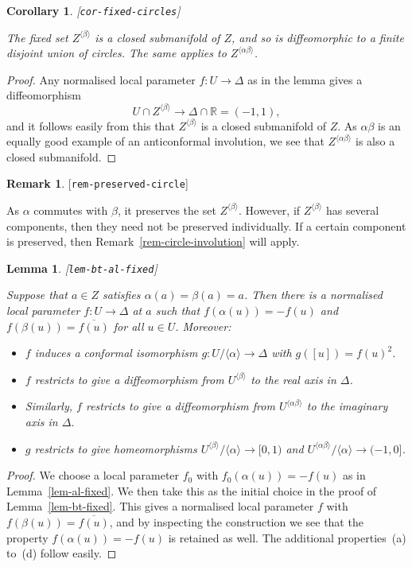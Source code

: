 \documentclass[reqno]{amsart}
\newcommand{\lbl}[1]{\label{#1}\textup{[\texttt{#1}]}\par}
\newcommand{\lbl}{\label}
\newcommand{\Dl}        {\Delta}
\newcommand{\al}        {\alpha}
\newcommand{\bt}        {\beta}
\newcommand{\R}         {{\mathbb{R}}}
\newcommand{\ov}[1]     {\overline{#1}}
\newcommand{\ip}[1]     {\langle #1\rangle}
\renewcommand{\:}{\colon}
\newtheorem{lemma}[theorem]{Lemma}
\newtheorem{corollary}[theorem]{Corollary}
\theoremstyle{definition}
\newtheorem{remark}[theorem]{Remark}
\begin{document}
\begin{corollary}\lbl{cor-fixed-circles}
 The fixed set $Z^{\ip{\bt}}$ is a closed submanifold of $Z$, and so
 is diffeomorphic to a finite disjoint union of circles.  The same
 applies to $Z^{\ip{\al\bt}}$.
\end{corollary}
\begin{proof}
 Any normalised local parameter $f\:U\to \Dl$ as in the lemma gives a
 diffeomorphism
 \[ U\cap Z^{\ip{\bt}}\to \Dl\cap\R = (-1,1), \]
 and it follows easily from this that $Z^{\ip{\bt}}$ is a closed
 submanifold of $Z$.  As $\al\bt$ is an equally good example of an
 anticonformal involution, we see that $Z^{\ip{\al\bt}}$ is also a
 closed submanifold.
\end{proof}

\begin{remark}\lbl{rem-preserved-circle}
 As $\al$ commutes with $\bt$, it preserves the set $Z^{\ip{\bt}}$.
 However, if $Z^{\ip{\bt}}$ has several components, then they need not
 be preserved individually.  If a certain component is preserved, then
 Remark~\ref{rem-circle-involution} will apply.
\end{remark}

\begin{lemma}\lbl{lem-bt-al-fixed}
 Suppose that $a\in Z$ satisfies $\al(a)=\bt(a)=a$.  Then there is a
 normalised local parameter $f\:U\to \Dl$ at $a$ such that
 $f(\al(u))=-f(u)$ and $f(\bt(u))=\ov{f(u)}$ for all $u\in U$.
 Moreover:
 \begin{itemize}
  \item[(a)] $f$ induces a conformal isomorphism
   $g\:U/\ip{\al}\to \Dl$ with $g([u])=f(u)^2$.
  \item[(b)] $f$ restricts to give a diffeomorphism from
   $U^{\ip{\bt}}$ to the real axis in $\Dl$.
  \item[(c)] Similarly, $f$ restricts to give a diffeomorphism from
   $U^{\ip{\al\bt}}$ to the imaginary axis in $\Dl$.
  \item[(d)] $g$ restricts to give homeomorphisms
   $U^{\ip{\bt}}/\ip{\al}\to [0,1)$ and
   $U^{\ip{\al\bt}}/\ip{\al}\to(-1,0]$.
 \end{itemize}
\end{lemma}
\begin{proof}
 We choose a local parameter $f_0$ with $f_0(\al(u))=-f(u)$ as in
 Lemma~\ref{lem-al-fixed}.  We then take this as the initial choice in
 the proof of Lemma~\ref{lem-bt-fixed}.  This gives a normalised local
 parameter $f$ with $f(\bt(u))=\ov{f(u)}$, and by inspecting the
 construction we see that the property $f(\al(u))=-f(u)$ is retained
 as well.  The additional properties~(a) to~(d) follow easily.
\end{proof}
\end{document}
